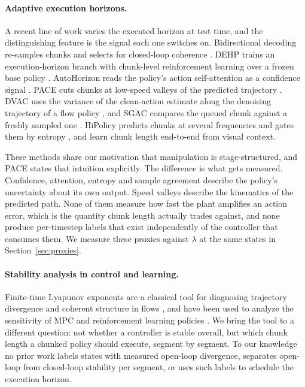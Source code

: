 \paragraph{Adaptive execution horizons.}
A recent line of work varies the executed horizon at test time, and the
distinguishing feature is the signal each one switches on. Bidirectional
decoding re-samples chunks and selects for closed-loop coherence
\citep{liu2024bidirectional}. DEHP trains an execution-horizon branch with
chunk-level reinforcement learning over a frozen base policy
\citep{zhao2026dehp}. AutoHorizon reads the policy's action self-attention as a
confidence signal \citep{wang2026autohorizon}. PACE cuts chunks at low-speed
valleys of the predicted trajectory \citep{nie2026pace}. DVAC uses the variance
of the clean-action estimate along the denoising trajectory of a flow policy
\citep{feng2026dvac}, and SGAC compares the queued chunk against a freshly
sampled one \citep{so2025sgac}. HiPolicy predicts chunks at several frequencies
and gates them by entropy \citep{zhang2026hipolicy}, and \citet{wen2026adaptive}
learn chunk length end-to-end from visual context.

These methods share our motivation that manipulation is stage-structured, and
PACE states that intuition explicitly. The difference is what gets measured.
Confidence, attention, entropy and sample agreement describe the policy's
uncertainty about its own output. Speed valleys describe the kinematics of the
predicted path. None of them measure how fast the plant amplifies an action
error, which is the quantity chunk length actually trades against, and none
produce per-timestep labels that exist independently of the controller that
consumes them. We measure these proxies against $\lambda$ at the same states in
Section~\ref{sec:proxies}.

\paragraph{Stability analysis in control and learning.}
Finite-time Lyapunov exponents are a classical tool for diagnosing trajectory
divergence and coherent structure in flows \citep{haller2015lcs}, and have been
used to analyze the sensitivity of MPC and reinforcement learning policies
\citep{krishna2023ftle}. We bring the tool to a different question: not whether
a controller is stable overall, but which chunk length a chunked policy should
execute, segment by segment. To our knowledge no prior work labels states with
measured open-loop divergence, separates open-loop from closed-loop stability
per segment, or uses such labels to schedule the execution horizon.
